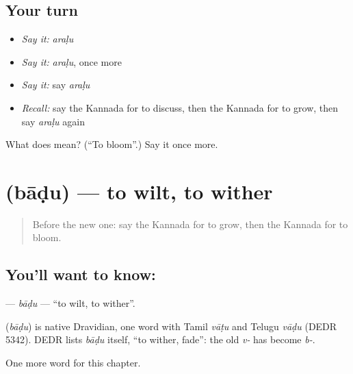\subsection*{Your turn}
\begin{itemize}
\raggedright
  \item \emph{Say it:} \emph{araḷu}
  \item \emph{Say it:} \emph{araḷu}, once more
  \item \emph{Say it:} say \emph{araḷu}
  \item \emph{Recall:} say the Kannada for to discuss, then the Kannada for to grow, then say \emph{araḷu} again
\end{itemize}

\begin{tcolorbox}[breakable,colback=teal!4,colframe=teal!35!black,title={Before you move on}]
What does  mean? (\textquotedblleft{}To bloom\textquotedblright{}.) Say it once more.
\end{tcolorbox}
\section[\texorpdfstring{\kn{ಬಾಡು} (bāḍu)}{ಬಾಡು (bāḍu)}]{ (bāḍu) — to wilt, to wither}

\label{lesson:KA-C203-badu}



\begin{quote}
Before the new one: say the Kannada for to grow, then the Kannada for to bloom.
\end{quote}

\subsection*{You'll want to know: }
\textbf{} — \emph{bāḍu} — \textquotedblleft{}to wilt, to wither\textquotedblright{}.

\begin{cousinweb}
\textbf{} (\emph{bāḍu}) is native Dravidian, one word with Tamil \emph{vāṭu} and Telugu \emph{vāḍu} (DEDR 5342). DEDR lists \emph{bāḍu} itself, \textquotedblleft{}to wither, fade\textquotedblright{}: the old \emph{v-} has become \emph{b-}.
\end{cousinweb}

\begin{grammarlens}[title={What you've built}]
One more word for this chapter.
\end{grammarlens}

